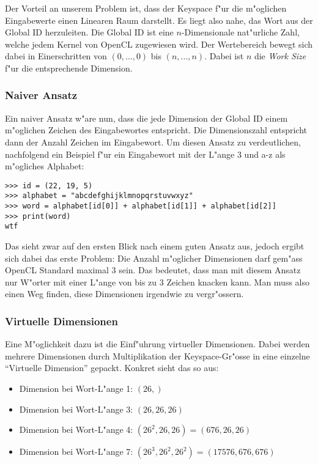 \begin{refsection}
Der Vorteil an unserem Problem ist, dass der Keyspace f"ur die m"oglichen
Eingabewerte einen Linearen Raum darstellt. Es liegt also nahe, das Wort aus der
Global ID herzuleiten. Die Global ID ist eine $n$-Dimensionale nat"urliche Zahl,
welche jedem Kernel von OpenCL zugewiesen wird. Der Wertebereich bewegt sich
dabei in Einerschritten von $(0, ..., 0)$ bis $(n, ..., n)$. Dabei ist $n$ die
\textit{Work Size} f"ur die entsprechende Dimension.

\subsubsection{Naiver Ansatz}

Ein naiver Ansatz w"are nun, dass die jede Dimension der Global ID einem
m"oglichen Zeichen des Eingabewortes entspricht. Die Dimensionszahl entspricht
dann der Anzahl Zeichen im Eingabewort. Um diesen Ansatz zu verdeutlichen,
nachfolgend ein Beispiel f"ur ein Eingabewort mit der L"ange 3 und a-z als
m"ogliches Alphabet:

\begin{small}
\begin{verbatim}
>>> id = (22, 19, 5)
>>> alphabet = "abcdefghijklmnopqrstuvwxyz"
>>> word = alphabet[id[0]] + alphabet[id[1]] + alphabet[id[2]]
>>> print(word)
wtf
\end{verbatim}
\end{small}

\noindent Das sieht zwar auf den ersten Blick nach einem guten Ansatz aus, jedoch ergibt
sich dabei das erste Problem: Die Anzahl m"oglicher Dimensionen darf gem"ass
OpenCL Standard\cite{crypto:stephan2011kryptographie} maximal 3 sein. Das
bedeutet, dass man mit diesem Ansatz nur W"orter mit einer L"ange von bis zu 3
Zeichen knacken kann. Man muss also einen Weg finden, diese Dimensionen
irgendwie zu vergr"ossern.

\subsubsection{Virtuelle Dimensionen}

Eine M"oglichkeit dazu ist die Einf"uhrung virtueller Dimensionen. Dabei werden
mehrere Dimensionen durch Multiplikation der Keyspace-Gr"osse in eine einzelne
``Virtuelle Dimension'' gepackt. Konkret sieht das so aus:

\begin{itemize}
	\item Dimension bei Wort-L"ange 1: $(26,)$
	\item Dimension bei Wort-L"ange 3: $(26, 26, 26)$
	\item Dimension bei Wort-L"ange 4: $(26^2, 26, 26) = (676, 26, 26)$
	\item Dimension bei Wort-L"ange 7: $(26^3, 26^2, 26^2) = (17576, 676, 676)$
\end{itemize}


\end{refsection}
